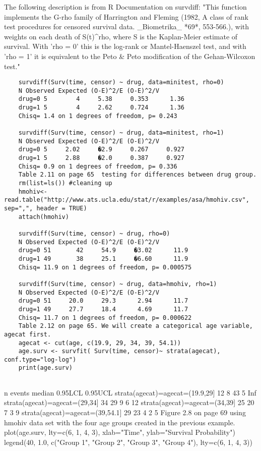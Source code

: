 \begin{frame}[fragile]
	
	The following description is from R Documentation on survdiff:  "This function implements the G-rho family of Harrington and Fleming (1982, A class of rank test procedures for censored survival data. _Biometrika_ *69*, 553-566.), with weights on each death of S(t)^rho, where S is the Kaplan-Meier estimate of survival. With 'rho = 0' this is the log-rank or Mantel-Haenszel test, and with 'rho = 1' it is equivalent to the Peto & Peto modification of the Gehan-Wilcoxon test."
		\begin{framed}
		\begin{verbatim}
	survdiff(Surv(time, censor) ~ drug, data=minitest, rho=0)
	N Observed Expected (O-E)^2/E (O-E)^2/V 
	drug=0 5        4     5.38     0.353      1.36
	drug=1 5        4     2.62     0.724      1.36
	Chisq= 1.4 on 1 degrees of freedom, p= 0.243
	
	survdiff(Surv(time, censor) ~ drug, data=minitest, rho=1)
	N Observed Expected (O-E)^2/E (O-E)^2/V 
	drug=0 5     2.02     �2.9     0.267     0.927
	drug=1 5     2.88     �2.0     0.387     0.927
	Chisq= 0.9 on 1 degrees of freedom, p= 0.336 
	Table 2.11 on page 65  testing for differences between drug group.
	rm(list=ls()) #cleaning up 
	hmohiv<-read.table("http://www.ats.ucla.edu/stat/r/examples/asa/hmohiv.csv", sep=",", header = TRUE) 
	attach(hmohiv)
	
	survdiff(Surv(time, censor) ~ drug, rho=0)
	N Observed Expected (O-E)^2/E (O-E)^2/V 
	drug=0 51       42     54.9     �3.02      11.9
	drug=1 49       38     25.1     �6.60      11.9
	Chisq= 11.9 on 1 degrees of freedom, p= 0.000575
	
	survdiff(Surv(time, censor) ~ drug, data=hmohiv, rho=1)
	N Observed Expected (O-E)^2/E (O-E)^2/V 
	drug=0 51     20.0     29.3      2.94      11.7
	drug=1 49     27.7     18.4      4.69      11.7
	Chisq= 11.7 on 1 degrees of freedom, p= 0.000622
	Table 2.12 on page 65. We will create a categorical age variable, agecat first.
	agecat <- cut(age, c(19.9, 29, 34, 39, 54.1))
	age.surv <- survfit( Surv(time, censor)~ strata(agecat), conf.type="log-log")
	print(age.surv)
	
	\end{verbatim}
	\end{framed}
		
	\end{frame}
	\begin{frame}[fragile]
		
	
	n events median 0.95LCL 0.95UCL
	strata(agecat)=agecat=(19.9,29] 12      8     43       5     Inf
	strata(agecat)=agecat=(29,34]   34     29      9       6      12
	strata(agecat)=agecat=(34,39]   25     20      7       3       9
	strata(agecat)=agecat=(39,54.1] 29     23      4       2       5
	Figure 2.8 on page 69 using hmohiv data set with the four age groups created in the previous example.
	plot(age.surv, lty=c(6, 1, 4, 3), xlab="Time", ylab="Survival Probability")
	legend(40, 1.0, c("Group 1", "Group 2", "Group 3", "Group 4"), lty=c(6, 1, 4, 3))

	
\end{frame}
